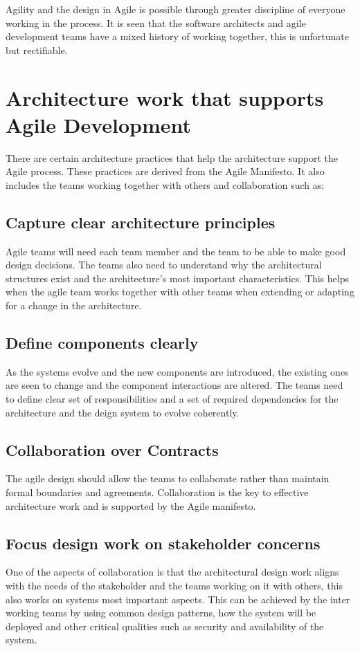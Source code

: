 \documentclass[sigconf]{acmart}
\begin{document}
Agility and the design in Agile is possible through greater discipline of everyone working in the process. It is seen that the software architects and agile development teams have a mixed history of working together, this is unfortunate but rectifiable. 

\section{Architecture work that supports Agile Development}
There are certain architecture practices that help the architecture support the Agile process. These practices are derived from the Agile Manifesto. It also includes the teams working together with others and collaboration such as:

\subsection{Capture clear architecture principles}
Agile teams will need each team member and the team to be able to make good design decisions. The teams also need to understand why the architectural structures exist and the architecture's most important characteristics. This helps when the agile team works together with other teams when extending or adapting for a change in the architecture.

\subsection{Define components clearly}
As the systems evolve and the new components are introduced, the existing ones are seen to change and the component interactions are altered. The teams need to define clear set of responsibilities and a set of required dependencies for the architecture and the deign system to evolve coherently.

\subsection{Collaboration over Contracts}
The agile design should allow the teams to collaborate rather than maintain formal boundaries and agreements. Collaboration is the key to effective architecture work and is supported by the Agile manifesto.

\subsection{Focus design work on stakeholder concerns}
One of the aspects of collaboration is that the architectural design work aligns with the needs of the stakeholder and the teams working on it with others, this also works on systems most important aspects. This can be achieved by the inter working teams by using common design patterns, how the system will be deployed and other critical qualities such as security and availability of the system.
\end{document}

